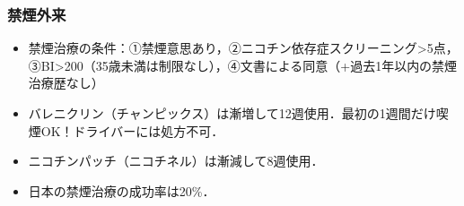 \subsubsection{禁煙外来}

\begin{itemize}
\item 禁煙治療の条件：①禁煙意思あり，②ニコチン依存症スクリーニング>5点，③BI>200（35歳未満は制限なし），④文書による同意（+過去1年以内の禁煙治療歴なし）
\item バレニクリン（チャンピックス\circledR）は漸増して12週使用．最初の1週間だけ喫煙OK！ドライバーには処方不可．
\item ニコチンパッチ（ニコチネル\circledR）は漸減して8週使用．
\item 日本の禁煙治療の成功率は20\%．
\end{itemize}

